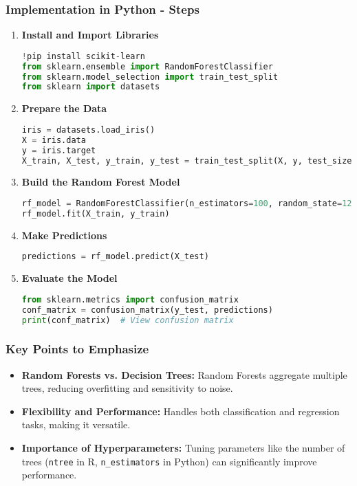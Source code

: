 \documentclass[aspectratio=169]{beamer}
\begin{document}
\begin{frame}[fragile]
    \frametitle{Implementation in Python - Steps}
    \begin{enumerate}
        \item \textbf{Install and Import Libraries}
        \begin{lstlisting}[language=Python]
!pip install scikit-learn
from sklearn.ensemble import RandomForestClassifier
from sklearn.model_selection import train_test_split
from sklearn import datasets
        \end{lstlisting}

        \item \textbf{Prepare the Data}
        \begin{lstlisting}[language=Python]
iris = datasets.load_iris()
X = iris.data
y = iris.target
X_train, X_test, y_train, y_test = train_test_split(X, y, test_size=0.3, random_state=123)
        \end{lstlisting}

        \item \textbf{Build the Random Forest Model}
        \begin{lstlisting}[language=Python]
rf_model = RandomForestClassifier(n_estimators=100, random_state=123)
rf_model.fit(X_train, y_train)
        \end{lstlisting}

        \item \textbf{Make Predictions}
        \begin{lstlisting}[language=Python]
predictions = rf_model.predict(X_test)
        \end{lstlisting}

        \item \textbf{Evaluate the Model}
        \begin{lstlisting}[language=Python]
from sklearn.metrics import confusion_matrix
conf_matrix = confusion_matrix(y_test, predictions)
print(conf_matrix)  # View confusion matrix
        \end{lstlisting}
    \end{enumerate}
\end{frame}

\begin{frame}[fragile]
    \frametitle{Key Points to Emphasize}
    \begin{itemize}
        \item \textbf{Random Forests vs. Decision Trees:} Random Forests aggregate multiple trees, reducing overfitting and sensitivity to noise.
        \item \textbf{Flexibility and Performance:} Handles both classification and regression tasks, making it versatile.
        \item \textbf{Importance of Hyperparameters:} Tuning parameters like the number of trees (\texttt{ntree} in R, \texttt{n\_estimators} in Python) can significantly improve performance.
    \end{itemize}
\end{frame}
\end{document}
